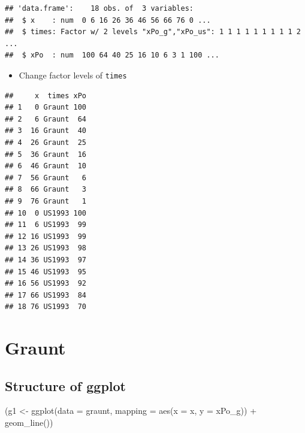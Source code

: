 \documentclass[
]{article}
\newenvironment{Shaded}{\begin{snugshade}}{\end{snugshade}}
\newcommand{\AttributeTok}[1]{\textcolor[rgb]{0.77,0.63,0.00}{#1}}
\newcommand{\FunctionTok}[1]{\textcolor[rgb]{0.00,0.00,0.00}{#1}}
\newcommand{\NormalTok}[1]{#1}
\newcommand{\OtherTok}[1]{\textcolor[rgb]{0.56,0.35,0.01}{#1}}
\newcommand{\SpecialCharTok}[1]{\textcolor[rgb]{0.00,0.00,0.00}{#1}}
\newcommand{\StringTok}[1]{\textcolor[rgb]{0.31,0.60,0.02}{#1}}
\providecommand{\tightlist}{%
  \setlength{\itemsep}{0pt}\setlength{\parskip}{0pt}}
\begin{document}
\begin{verbatim}
## 'data.frame':    18 obs. of  3 variables:
##  $ x    : num  0 6 16 26 36 46 56 66 76 0 ...
##  $ times: Factor w/ 2 levels "xPo_g","xPo_us": 1 1 1 1 1 1 1 1 1 2 ...
##  $ xPo  : num  100 64 40 25 16 10 6 3 1 100 ...
\end{verbatim}

\begin{itemize}
\tightlist
\item
  Change factor levels of \texttt{times}
\end{itemize}

\begin{Shaded}
\end{Shaded}

\begin{verbatim}
##     x  times xPo
## 1   0 Graunt 100
## 2   6 Graunt  64
## 3  16 Graunt  40
## 4  26 Graunt  25
## 5  36 Graunt  16
## 6  46 Graunt  10
## 7  56 Graunt   6
## 8  66 Graunt   3
## 9  76 Graunt   1
## 10  0 US1993 100
## 11  6 US1993  99
## 12 16 US1993  99
## 13 26 US1993  98
## 14 36 US1993  97
## 15 46 US1993  95
## 16 56 US1993  92
## 17 66 US1993  84
## 18 76 US1993  70
\end{verbatim}

\hypertarget{graunt}{%
\section{Graunt}\label{graunt}}

\hypertarget{structure-of-ggplot}{%
\subsection{Structure of ggplot}\label{structure-of-ggplot}}

\begin{Shaded}
\begin{Highlighting}[]
\NormalTok{(g1 }\OtherTok{\textless{}{-}} \FunctionTok{ggplot}\NormalTok{(}\AttributeTok{data =}\NormalTok{ graunt,}
              \AttributeTok{mapping =} \FunctionTok{aes}\NormalTok{(}\AttributeTok{x =}\NormalTok{ x, }\AttributeTok{y =}\NormalTok{ xPo\_g)) }\SpecialCharTok{+} 
   \FunctionTok{geom\_line}\NormalTok{())}
\end{Highlighting}
\end{Shaded}
\end{document}
